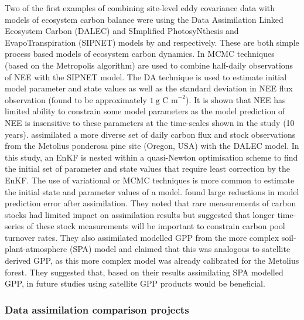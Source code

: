 Two of the first examples of combining site-level eddy covariance data with models of ecosystem carbon balance were using the Data Assimilation Linked Ecosystem Carbon (DALEC) and SImplified PhotosyNthesis and EvapoTranspiration (SIPNET) models by \citet{williams2005improved} and \citet{braswell2005estimating} respectively. These are both simple process based models of ecosystem carbon dynamics. In \citet{braswell2005estimating} MCMC techniques (based on the Metropolis algorithm) are used to combine half-daily observations of NEE with the SIPNET model. The DA technique is used to estimate initial model parameter and state values as well as the standard deviation in NEE flux observation (found to be approximately \(1~\text{g C m}^{-2}\)). It is shown that NEE has limited ability to constrain some model parameters as the model prediction of NEE is insensitive to these parameters at the time-scales shown in the study (10 years). \citet{williams2005improved} assimilated a more diverse set of daily carbon flux and stock observations from the Metolius ponderosa pine site (Oregon, USA) with the DALEC model. In this study, an EnKF is nested within a quasi-Newton optimisation scheme to find the initial set of parameter and state values that require least correction by the EnKF. The use of variational or MCMC techniques is more common to estimate the initial state and parameter values of a model. \citet{williams2005improved} found large reductions in model prediction error after assimilation. They noted that rare measurements of carbon stocks had limited impact on assimilation results but suggested that longer time-series of these stock measurements will be important to constrain carbon pool turnover rates. They also assimilated modelled GPP from the more complex soil-plant-atmosphere (SPA) model \citep{williams1997predicting} and claimed that this was analogous to satellite derived GPP, as this more complex model was already calibrated for the Metolius forest. They suggested that, based on their results assimilating SPA modelled GPP, in future studies using satellite GPP products would be beneficial.  

\subsubsection{Data assimilation comparison projects} 


